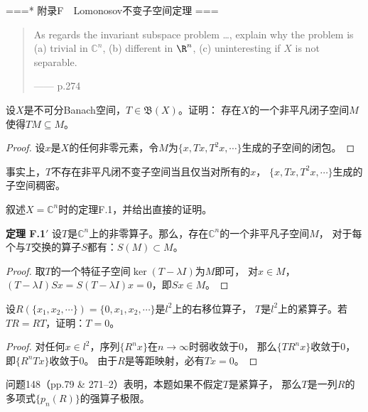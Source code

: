 ===* 附录F\ \ Lomonosov不变子空间定理 ===
\begin{quotation}
    \quad As regards the invariant subspace problem …, 
    explain why the problem is (a) trivial in $\mathbb{C}^n$, 
    (b) different in $\R^n$, (c) uninteresting if $X$ is not separable.
    \begin{flushright}
        ------ \cite{Ru} p.274
    \end{flushright}
\end{quotation}
\begin{1}
    设$X$是不可分Banach空间，$T\in\mathfrak{B}(X)$。证明：
    存在$X$的一个非平凡闭子空间$M$使得$TM\subseteq M$。
\end{1}
\begin{proof}
    设$x$是$X$的任何非零元素，令$M$为$\{x,Tx,T^2x,\cdots\}$生成的子空间的闭包。
\end{proof}
\begin{remark*}
    事实上，$T$不存在非平凡闭不变子空间当且仅当对所有的$x$，
    $\{x,Tx,T^2x,\cdots\}$生成的子空间稠密。
\end{remark*}

\begin{2}
    叙述$X=\mathbb{C}^n$时的定理F.1，并给出直接的证明。
\end{2}
\textbf{定理 F.1$'$}
    设$T$是$\mathbb{C}^n$上的非零算子。那么，存在$\mathbb{C}^n$的一个非平凡子空间$M$，
    对于每个与$T$交换的算子$S$都有：$S(M) \subset M$。
\begin{proof}
    取$T$的一个特征子空间$\ker(T-\lambda I)$为$M$即可，
    对$x \in M$，$(T-\lambda I)Sx=S(T-\lambda I)x=0$，即$Sx \in M$。
\end{proof}
\begin{3}
    设$R(\{x_1,x_2,\cdots\})=\{0,x_1,x_2,\cdots\}$是$l^2$上的右移位算子，
    $T$是$l^2$上的紧算子。若$TR=RT$，证明：$T=0$。
\end{3}
\begin{proof}
    对任何$x \in l^2$，序列$\{R^nx\}$在$n\to\infty$时弱收敛于$0$，
    那么$\{TR^nx\}$收敛于$0$，即$\{R^nTx\}$收敛于$0$。
    由于$R$是等距映射，必有$Tx=0$。
\end{proof}
\begin{remark*}
    \cite{Ha} 问题148（pp.79 \& 271--2）表明，本题如果不假定$T$是紧算子，
    那么$T$是一列$R$的多项式$\{p_n(R)\}$的强算子极限。
\end{remark*}

